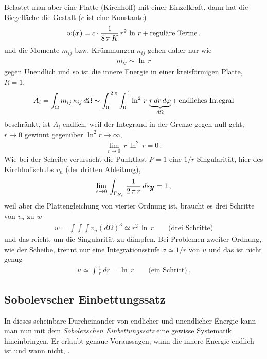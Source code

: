 {{{{{Belastet man aber eine Platte (Kirchhoff) mit einer Einzelkraft, dann hat die Biegefl\"{a}che die Gestalt ($c $ ist eine Konstante)
\begin{align}
w(\mbox{\boldmath $x$}) = c \cdot \frac{1}{8\,\pi\,K}\,r^2\,\ln\,r + \text{regul\"{a}re Terme}\,.
\end{align}
und die Momente $m_{ij}$ bzw. Kr\"{u}mmungen $\kappa_{ij}$ gehen daher \glq nur\grq{} wie
\begin{align}
m_{ij} \sim \ln\,r
\end{align}
gegen Unendlich und so ist die innere Energie in einer kreisf\"{o}rmigen Platte, $R = 1$,
\begin{align}
A_i = \int_{\Omega} m_{ij}\,\kappa_{ij} \,d\Omega  \sim \int_0^{\,2\,\pi} \int_0^{\,1} \ln^2\,r\,\underbrace{r\,dr\,d\varphi}_{d \Omega} + \,\text{endliches Integral}
\end{align}
beschr\"{a}nkt, ist $A_i$ endlich, weil der Integrand in der Grenze gegen null geht, $r \to 0$ gewinnt gegen\"{u}ber $\ln^2 r \to \infty$,
\begin{align}
\lim_{r \to 0}\,r\,\ln^2\,r = 0\,.
\end{align}
Wie bei der Scheibe verursacht die Punktlast $P = 1$ eine $1/r$ Singularit\"{a}t, hier des Kirchhoffschubs $v_n$ (der \glq dritten\grq{} Ableitung),
\begin{align}
\lim_{\varepsilon \to 0}\,\int_{\Gamma_{N_\varepsilon}} \frac{1}{2\,\pi\,r}\,ds_{\mbox{\boldmath $y$}} = 1\,,
\end{align}
weil aber die Plattengleichung von vierter Ordnung ist, braucht es drei Schritte von $v_n$ zu $w$
\begin{align}
w = \int \int \int v_n (d\Omega)^3 \simeq r^2\,\ln\,r\qquad\text{(drei Schritte)}
\end{align}
und das reicht, um die Singularit\"{a}t zu d\"{a}mpfen. Bei Problemen zweiter Ordnung, wie der Scheibe, trennt nur eine Integrationsstufe $\sigma \simeq 1/r$ von $u$ und das ist nicht genug
\begin{align}
u \simeq \int \frac{1}{r}\,dr = \ln\,r \qquad\text{(ein Schritt)}\,.
\end{align}
{\textcolor{sectionTitleBlue}{\section{Sobolevscher Einbettungssatz}}}
In dieses scheinbare Durcheinander von endlicher und unendlicher Energie kann man nun mit dem {\em Sobolevschen Einbettungssatz\/} eine gewisse Systematik hineinbringen. Er erlaubt genaue Voraussagen, wann die innere Energie endlich ist und wann nicht, \cite{Ha6}.

}}}}}
